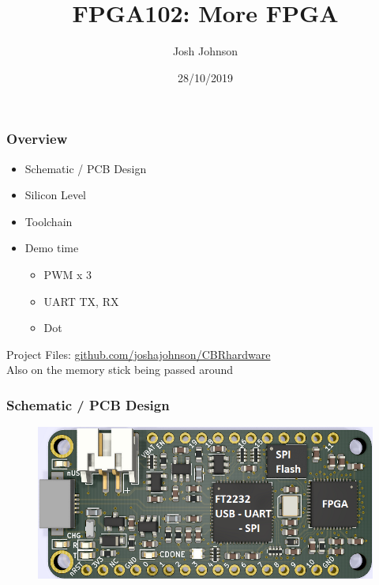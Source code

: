 \documentclass[t]{beamer}
\title[FPGA102]{FPGA102: More FPGA} %
\author{Josh Johnson} %
\institute[] %
{ \\ %
\medskip
\textit{} %
}
\date{28/10/2019} %
\begin{document}
\begin{frame}
\titlepage %
\end{frame}


\begin{frame}
\frametitle{Overview}
\begin{itemize}
\item Schematic / PCB Design
\item Silicon Level
\item Toolchain
\item Demo time
\begin{itemize}
	\item PWM x 3
	\item UART TX, RX
	\item Dot
\end{itemize}

\end{itemize}
\vspace{20mm}
Project Files: \url{github.com/joshajohnson/CBRhardware}\\
Also on the memory stick being passed around
\end{frame}


\begin{frame}[t]
\frametitle{Schematic / PCB Design}
\begin{figure}
	\includegraphics[width=\linewidth]{top_render_annotated.png}
\end{figure}
\end{frame}

\end{document}
